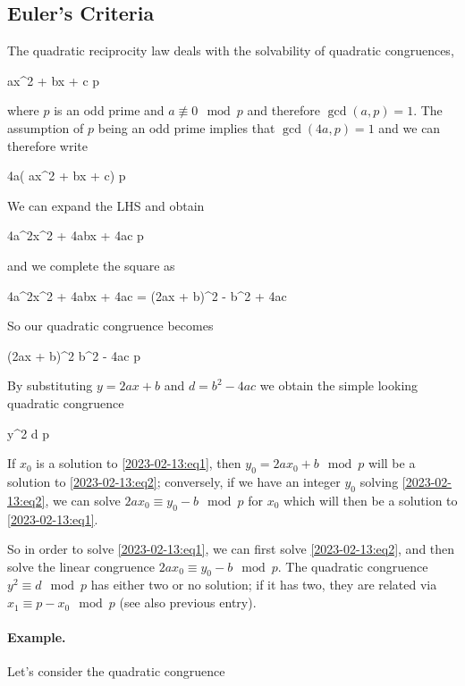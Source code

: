 
\subsection{Euler’s Criteria}

The quadratic reciprocity law deals with the solvability of quadratic congruences,

\be\label{2023-02-13:eq1}
ax^2 + bx + c  \mod p
\ee

where $p$ is an odd prime and $a \not\equiv 0 \mod p$ and therefore $\gcd(a,p) = 1$. The assumption of $p$ being an odd prime implies that $\gcd(4a, p) = 1$  and we can therefore write

\bee
4a( ax^2 + bx + c)  \mod p
\eee

We can expand the LHS and obtain

\bee
4a^2x^2 + 4abx + 4ac  \mod p
\eee

and we complete the square as

\bee
4a^2x^2 + 4abx + 4ac = (2ax + b)^2 - b^2 + 4ac
\eee

So our quadratic congruence becomes

\bee
(2ax + b)^2 \equiv b^2 - 4ac \mod p
\eee

By substituting $y = 2ax + b$ and $d = b^2 - 4ac$ we obtain the simple looking quadratic congruence

\be\label{2023-02-13:eq2}
y^2 \equiv d \mod p
\ee

If $x_0$ is a solution to \eqref{2023-02-13:eq1}, then $y_0 = 2ax_0 + b \mod p$ will be a solution to \eqref{2023-02-13:eq2}; conversely, if we have an integer $y_0$ solving \eqref{2023-02-13:eq2}, we can solve $2ax_0 \equiv y_0 - b \mod p$ for $x_0$ which will then be a solution to \eqref{2023-02-13:eq1}.

So in order to solve \eqref{2023-02-13:eq1}, we can first solve \eqref{2023-02-13:eq2}, and then solve the linear congruence $2ax_0 \equiv y_0 - b \mod p$. The quadratic congruence $y^2 \equiv d \mod p$ has either two or no solution; if it has two, they are related via $x_1 \equiv p - x_0 \mod p$ (see also previous entry).

\paragraph{Example.} Let's consider the quadratic congruence

